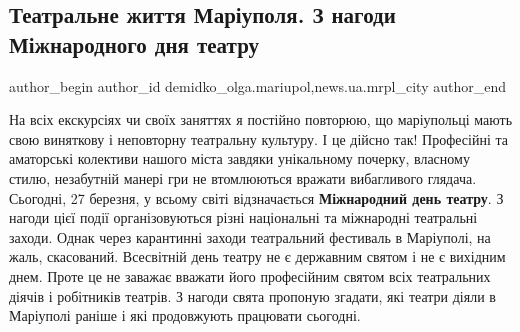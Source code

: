  
 
 
 
 
 
\subsection{Театральне життя Маріуполя. З нагоди Міжнародного дня театру}
\label{sec:27_03_2020.stz.news.ua.mrpl_city.1.teatr_zhyttja_mrpl_den_teatru}
 
\ifcmt
 author_begin
   author_id demidko_olga.mariupol,news.ua.mrpl_city
 author_end
\fi


На всіх екскурсіях чи своїх заняттях я постійно повторюю, що маріупольці мають
свою виняткову і неповторну театральну культуру. І це дійсно так! Професійні та
аматорські колективи нашого міста завдяки унікальному почерку, власному стилю,
незабутній манері гри не втомлюються вражати вибагливого глядача. Сьогодні, 27
березня, у всьому світі відзначається \textbf{Міжнародний день театру}. З нагоди цієї
події організовуються різні національні та міжнародні театральні заходи. Однак
через карантинні заходи театральний фестиваль в Маріуполі, на жаль, скасований.
Всесвітній день театру не є державним святом і не є вихідним днем. Проте це не
заважає вважати його професійним святом всіх театральних діячів і робітників
театрів. З нагоди свята пропоную згадати, які театри діяли в Маріуполі раніше і
які продовжують працювати сьогодні.

